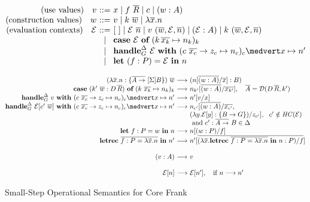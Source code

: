 \documentclass[12pt]{article}
\makeatletter
\newcommand{\EC}{\mathcal{E}}
\newcommand{\many}{\overline}
\newcommand{\reducesto}{\longrightarrow}
\newcommand\ba{\begin{array}}
\newcommand\ea{\end{array}}
\newenvironment{equations}{\[\ba{@{}r@{~}c@{~}l@{}}}{\ea\]\ignorespacesafterend}
\newcommand{\sigs}{\Sigma}
\newcommand{\effbox}[1]{[#1]}
\newcommand{\key}[1]{\textbf{#1}} %
\newcommand{\var}{\mathit}        %
\newcommand{\handleSymbol}{\rightarrow}
\newcommand{\handle}[2]{{#1} \handleSymbol {#2}}
\newcommand{\thunk}[1]{\{{#1}\}}
\newcommand{\adj}{\Delta}
\makeatother
\begin{document}
\begin{figure*}
\small
\begin{equations}
(\textrm{use values}) \quad v &::=& x \mid f~\many{R} \mid c \mid (w : A) \\
(\textrm{construction values}) \quad w &::=& v \mid k~\many{w} \mid \lambda \many{x}.n \\
(\textrm{evaluation contexts})\quad \EC
  &::= & [~] \mid \EC~\many{n} \mid v~(\many{w},\EC,\many{n})
             \mid (\EC : A)
             \mid k~(\many{w},\EC,\many{n})\\
             &\mid& \key{case}~\EC~\key{of}~(k\,\many{x_k} \mapsto n_k)_k \\
  &\mid& \key{handle}^\adj_G~ \EC ~\key{with}~
            (\handle{c~\many{x_c}}{z_c} \mapsto n_c)_c \medvert
            x \mapsto n' \\
  &\mid& \key{let}~(f : P) = \EC~\key{in}~n \\
\end{equations}%

\begin{equations}
(\lambda \many{x}.n : \thunk{\many{A \to}~\effbox{\sigs}B})~\many{w} &\reducesto& (n[\many{(w : A)} / \many{x}] : B) \\
\key{case}~(k'~\many{w} : D\,\many{R})~\key{of}~(k~\many{x_k} \mapsto n_k)_k
  &\reducesto& n_{k'}[\many{(w : A)} / \many{x_{k'}}],
     \quad \many{A} = \dcon(D\,\many{R}, k') \\
\key{handle}^\adj_G~v~\key{with}~(\handle{c~\many{x_c}}{z_c} \mapsto n_c)_c \medvert x \mapsto n'
  &\reducesto& n'[v / x] \\
\key{handle}^\adj_G~\EC[c'~\many{w}]~\key{with}~(\handle{c~\many{x_c}}{z_c} \mapsto n_c)_c \medvert x \mapsto n'
  &\reducesto& n_{c'}[\many{(w : A)} / \many{x_{c'}},\\
  && (\lambda y.\EC[y] : \thunk{B \to G}) / z_{c'}],
  ~~ c' \notin \var{HC}(\EC) \\ 
  && \text{ and }
  c':\many{A \to}~B \in \adj \\
\key{let}~f : P = w~\key{in}~n
  &\reducesto&
    n[(w : P) / f] \\
\key{letrec}~\many{f : P = \lambda \many{x}.n}~\key{in}~n'
  &\reducesto&
    n'[\many{(\lambda \many{x}.\key{letrec}~\many{f : P = \lambda \many{x}.n}~\key{in}~n : P) / f}] \\
\\
(v : A) &\reducesto& v \\
\\
\EC[n] &\reducesto& \EC[n'], \quad \text{if }n \reducesto n' \\
\end{equations}%

\caption{Small-Step Operational Semantics for Core Frank}
\label{fig:semantics}
\end{figure*}
\end{document}
